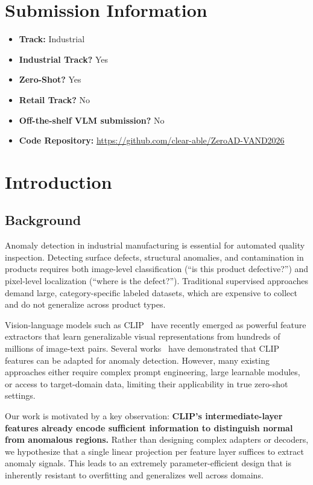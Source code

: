 \documentclass[10pt,twocolumn,letterpaper]{article}
\begin{document}
\section{Submission Information}

\begin{itemize}[leftmargin=*,nosep]
  \item \textbf{Track:} Industrial
  \item \textbf{Industrial Track?} Yes
  \item \textbf{Zero-Shot?} Yes
  \item \textbf{Retail Track?} No
  \item \textbf{Off-the-shelf VLM submission?} No
  \item \textbf{Code Repository:} \url{https://github.com/clear-able/ZeroAD-VAND2026}
\end{itemize}

\section{Introduction}

\subsection{Background}

Anomaly detection in industrial manufacturing is essential for automated quality inspection. Detecting surface defects, structural anomalies, and contamination in products requires both image-level classification (``is this product defective?'') and pixel-level localization (``where is the defect?''). Traditional supervised approaches demand large, category-specific labeled datasets, which are expensive to collect and do not generalize across product types.

Vision-language models such as CLIP~\cite{radford2021clip} have recently emerged as powerful feature extractors that learn generalizable visual representations from hundreds of millions of image-text pairs. Several works~\cite{anomalyclip} have demonstrated that CLIP features can be adapted for anomaly detection. However, many existing approaches either require complex prompt engineering, large learnable modules, or access to target-domain data, limiting their applicability in true zero-shot settings.

Our work is motivated by a key observation: \textbf{CLIP's intermediate-layer features already encode sufficient information to distinguish normal from anomalous regions.} Rather than designing complex adapters or decoders, we hypothesize that a single linear projection per feature layer suffices to extract anomaly signals. This leads to an extremely parameter-efficient design that is inherently resistant to overfitting and generalizes well across domains.
\end{document}
